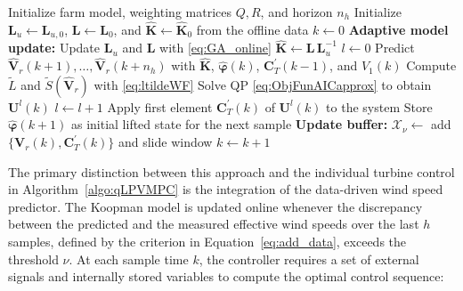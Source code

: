 \begin{algorithm} \caption{Adaptive qLMPC for AIC}\label{algo:qLPVMPCAIC}
    \begin{algorithmic}[1]
        \State Initialize farm model, weighting matrices $Q, R$, and horizon $n_h$
        \State Initialize $\mathbf{L}_u \gets \mathbf{L}_{u,0}$, $\mathbf{L} \gets \mathbf{L}_0$, and $\hat{\bm{K}} \gets \hat{\bm{K}}_0$ from the offline data
        \State $k \gets 0$
        \State \textbf{Adaptive model update:}
        \State Update $\mathbf{L}_u$ and $\mathbf{L}$ with \eqref{eq:GA_online}
        \State $\hat{\bm{K}} \gets \mathbf{L}\,\mathbf{L}_u^{-1}$ 
        \EndIf
        \State $l \gets 0$
         
        \State Predict $\hat{\bm{V}}_r(k+1), \dots, \hat{\bm{V}}_r(k+n_h)$ with $\hat{\bm{K}}$, $\hat{\bm{\varphi}}(k)$, $\bm{C}_T^\prime(k-1)$, and $V_1(k)$
        \State Compute $\tilde{L}$ and $\tilde{S}(\hat{\bm{V}}_r)$ with \eqref{eq:ltildeWF}
        \State Solve QP \eqref{eq:ObjFunAICapprox} to obtain $\bm{U}^l(k)$
        \State $l \gets l + 1$
        \EndWhile
        \State Apply first element $\bm{C}_T^\prime(k)$ of $\bm{U}^l(k)$ to the system
        \State Store $\hat{\bm{\varphi}}(k+1)$ as initial lifted state for the next sample
        \State \textbf{Update buffer:}
        \State $\mathcal{X}_{\nu} \gets$ add $\{\bm{V}_r(k), \bm{C}_T^\prime(k)\}$ and slide window
        \State $k \gets k + 1$
        \EndWhile
        \EndProcedure
    \end{algorithmic}
\end{algorithm}
%
The primary distinction between this approach and the individual turbine control in Algorithm~\ref{algo:qLPVMPC} is the integration of the data-driven wind speed predictor. The Koopman model is updated online whenever the discrepancy between the predicted and the measured effective wind speeds over the last $h$ samples, defined by the criterion in Equation~\eqref{eq:add_data}, exceeds the threshold $\nu$.
%
At each sample time $k$, the controller requires a set of external signals and internally stored variables to compute the optimal control sequence:

